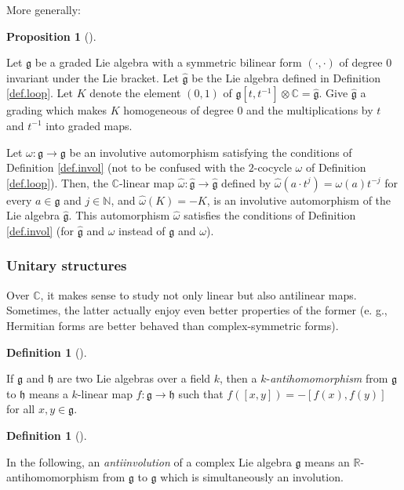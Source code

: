 \documentclass
[numbers=enddot,12pt,final,onecolumn,german,notitlepage]{scrartcl}%
\theoremstyle{definition}
\newtheorem{prop}[theo]{Proposition}
\newenvironment{proposition}[1][]
{\begin{prop}[#1]\begin{leftbar}}
{\end{leftbar}\end{prop}}
\newtheorem{defi}[theo]{Definition}
\newenvironment{definition}[1][]
{\begin{defi}[#1]\begin{leftbar}}
{\end{leftbar}\end{defi}}
\begin{document}
More generally:

\begin{proposition}
Let $\mathfrak{g}$ be a graded Lie algebra with a symmetric bilinear form
$\left(  \cdot,\cdot\right)  $ of degree $0$ invariant under the Lie bracket.
Let $\widehat{\mathfrak{g}}$ be the Lie algebra defined in Definition
\ref{def.loop}. Let $K$ denote the element $\left(  0,1\right)  $ of
$\mathfrak{g}\left[  t,t^{-1}\right]  \otimes\mathbb{C}=\widehat{\mathfrak{g}%
}$. Give $\widehat{\mathfrak{g}}$ a grading which makes $K$ homogeneous of
degree $0$ and the multiplications by $t$ and $t^{-1}$ into graded maps.

Let $\omega:\mathfrak{g}\rightarrow\mathfrak{g}$ be an involutive automorphism
satisfying the conditions of Definition \ref{def.invol} (not to be confused
with the $2$-cocycle $\omega$ of Definition \ref{def.loop}). Then, the
$\mathbb{C}$-linear map $\widehat{\omega}:\widehat{\mathfrak{g}}%
\rightarrow\widehat{\mathfrak{g}}$ defined by $\widehat{\omega}\left(  a\cdot
t^{j}\right)  =\omega\left(  a\right)  t^{-j}$ for every $a\in\mathfrak{g}$
and $j\in\mathbb{N}$, and $\widehat{\omega}\left(  K\right)  =-K$, is an
involutive automorphism of the Lie algebra $\widehat{\mathfrak{g}}$. This
automorphism $\widehat{\omega}$ satisfies the conditions of Definition
\ref{def.invol} (for $\widehat{\mathfrak{g}}$ and $\widehat{\omega}$ instead
of $\mathfrak{g}$ and $\omega$).
\end{proposition}

\subsubsection{Unitary structures}

Over $\mathbb{C}$, it makes sense to study not only linear but also antilinear
maps. Sometimes, the latter actually enjoy even better properties of the
former (e. g., Hermitian forms are better behaved than complex-symmetric forms).

\begin{definition}
If $\mathfrak{g}$ and $\mathfrak{h}$ are two Lie algebras over a field $k$,
then a $k$-\textit{antihomomorphism} from $\mathfrak{g}$ to $\mathfrak{h}$
means a $k$-linear map $f:\mathfrak{g}\rightarrow\mathfrak{h}$ such that
$f\left(  \left[  x,y\right]  \right)  =-\left[  f\left(  x\right)  ,f\left(
y\right)  \right]  $ for all $x,y\in\mathfrak{g}$.
\end{definition}

\begin{definition}
In the following, an \textit{antiinvolution} of a complex Lie algebra
$\mathfrak{g}$ means an $\mathbb{R}$-antihomomorphism from $\mathfrak{g}$ to
$\mathfrak{g}$ which is simultaneously an involution.
\end{definition}
\end{document}
